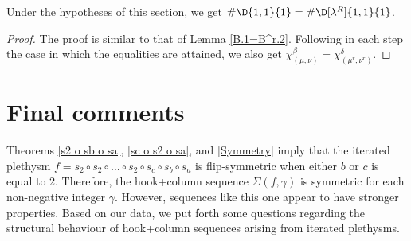 \documentclass[twoside]{article}
\begin{document}
\begin{lem}\label{B.3=B^r.3}Under the hypotheses of this section, we get $\#\D{1,1}{1}=\#\D[\lambda^R]{1,1}{1}$.
\end{lem}
\begin{proof} The proof is similar to that of Lemma \ref{B.1=B^r.2}. Following in each step the case in which the equalities are attained, we also get $\chi_{(\mu,\nu)}^\beta = \chi_{(\mu^r,\nu^r)}^\delta$.
\end{proof}





\section{Final comments}
\label{final_comments}




 Theorems \ref{s2 o sb o sa}, \ref{sc o s2 o sa},  and \ref{Symmetry} imply that the iterated plethysm $f = s_2\circ s_2\circ \ldots\circ s_2\circ s_c\circ s_b\circ s_a$ is flip-symmetric when either $b$ or $c$ is equal to 2.  Therefore, the hook+column sequence $\Sigma(f,\gamma) $ is symmetric for each non-negative integer $\gamma$. However, sequences like this one appear to have stronger properties.  Based on our data, we put forth some questions regarding the structural behaviour of hook+column sequences arising from iterated plethysms.
\end{document}
